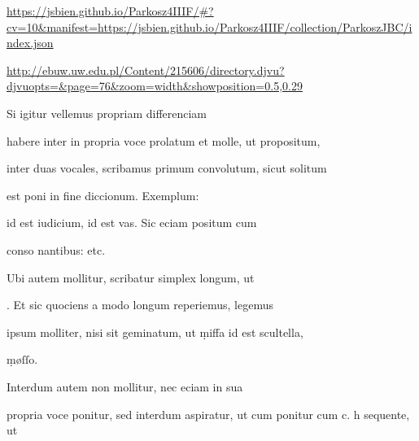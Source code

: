 
\newParkoszpage

{
  \url{https://jsbien.github.io/Parkosz4IIIF/\#?cv=10&manifest=https://jsbien.github.io/Parkosz4IIIF/collection/ParkoszJBC/index.json}

\url{http://ebuw.uw.edu.pl/Content/215606/directory.djvu?djvuopts=&page=76&zoom=width&showposition=0.5,0.29}
}

\bigskip

\obeylines
\mono



\fullpreviouslines


{
\color{blue}



\indentK Si igitur vellemus propriam differenciam

\fulllines

habere inter  in propria voce prolatum et  molle, ut propositum,
}


\fulllines

inter duas vocales, scribamus primum convolutum, sicut solitum

est poni in fine diccionum. Exemplum:   

 id est iudicium,  id est vas. Sic eciam positum cum

conso nantibus:      etc.

Ubi autem mollitur, scribatur simplex longum, ut 

. Et sic quociens a modo  longum reperiemus, legemus

ipsum molliter, nisi sit geminatum, ut ṃiffa id est scultella,

\splitlines

ṃøſſo.

\indentK Interdum autem  non mollitur, nec eciam in sua

\fulllines

propria voce ponitur, sed interdum aspiratur, ut cum ponitur cum
 c. h sequente, ut   

